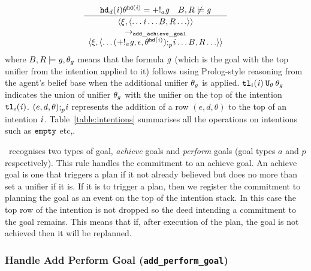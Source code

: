 \begin{equation}
\frac{\mathit{{\tt hd}_d}(\mathit{i})\theta^{{\tt hd}(\mathit{i})} = +!_{a}\mathit{g}
\quad B, R \not \models \mathit{g} 
}{
  \begin{array}{c}
\langle \xi, \langle \ldots  \mathit{i} \ldots B, R \ldots \rangle \rangle \\ \rightarrow_{\tt add\_achieve\_goal} \\
\langle \xi, \langle \ldots (+!_{a}\mathit{g}, \epsilon, \theta^{{\tt hd}(\mathit{i})}) {\tt ;}_p \mathit{i} \ldots B, R \ldots \rangle \rangle 
\end{array}
}
\end{equation}
where $B, R \models  \mathit{g}, \theta_g$ means that the
formula $\mathit{g}$ (which is the goal with the top unifier from the intention applied to it) follows using Prolog-style reasoning from the agent's belief base when the additional unifier $\theta_{\mathit{g}}$ is applied.  ${\tt tl}_i(\mathit{i}) \: {\tt U}_{\theta} \: \theta_g$ indicates the union of unifier $\theta_g$ with the unifier on the top of the intention ${\tt tl}_i(\mathit{i})$.  $(e, d, \theta) {\tt ;}_p \mathit{i}$ represents the addition of a row $(e, d, \theta)$ to the top of an intention $\mathit{i}$.  Table~\ref{table:intentions} summarises all the operations on intentions such as ${\tt empty}$ etc,.

\gwendolen\ recognises two types of goal, \emph{achieve} goals and \emph{perform} goals (goal types $a$ and $p$ respectively).  This rule handles the commitment to an achieve goal.  An achieve goal is one that triggers a plan if it not already believed but
does no more than set a unifier if it is.  If it is to trigger a plan,
then we register the  commitment to planning the goal as an event on the top of the
intention stack.
In this case the top row of the intention is not dropped so the deed intending a commitment to the goal remains.  This means that if, after execution of the plan, the goal  is not achieved then it will be replanned.



\subsubsection*{Handle Add Perform Goal ({\tt add\_perform\_goal})}

